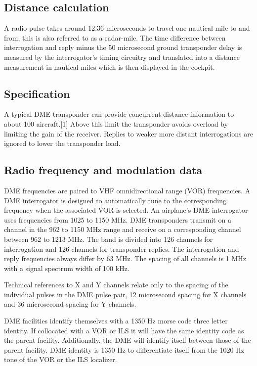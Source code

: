 \subsection*{Distance calculation}
\label{Distance calculation}


A radio pulse takes around 12.36 microseconds to travel one nautical mile to and from, this is also referred to as a radar-mile. The time difference between interrogation and reply minus the 50 microsecond ground transponder delay is measured by the interrogator's timing circuitry and translated into a distance measurement in nautical miles which is then displayed in the cockpit.

\subsection*{Specification}
\label{Specification}


A typical DME transponder can provide concurrent distance information to about 100 aircraft.[1] Above this limit the transponder avoids overload by limiting the gain of the receiver. Replies to weaker more distant interrogations are ignored to lower the transponder load.

\subsection*{Radio frequency and modulation data}
\label{Radio frequency and modulation data}


DME frequencies are paired to VHF omnidirectional range (VOR) frequencies. A DME interrogator is designed to automatically tune to the corresponding frequency when the associated VOR is selected. An airplane’s DME interrogator uses frequencies from 1025 to 1150 MHz. DME transponders transmit on a channel in the 962 to 1150 MHz range and receive on a corresponding channel between 962 to 1213 MHz. The band is divided into 126 channels for interrogation and 126 channels for transponder replies. The interrogation and reply frequencies always differ by 63 MHz. The spacing of all channels is 1 MHz with a signal spectrum width of 100 kHz.

Technical references to X and Y channels relate only to the spacing of the individual pulses in the DME pulse pair, 12 microsecond spacing for X channels and 36 microsecond spacing for Y channels.

DME facilities identify themselves with a 1350 Hz morse code three letter identity. If collocated with a VOR or ILS it will have the same identity code as the parent facility. Additionally, the DME will identify itself between those of the parent facility. DME identity is 1350 Hz to differentiate itself from the 1020 Hz tone of the VOR or the ILS localizer.

